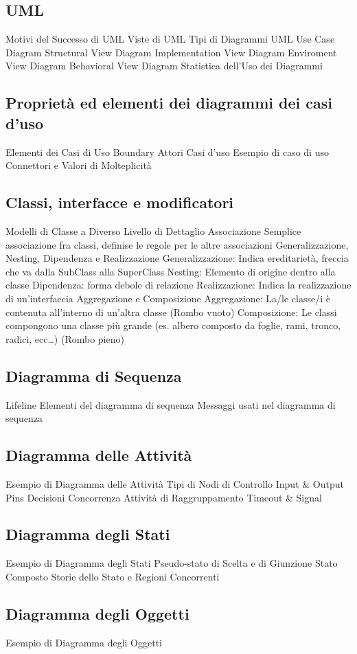 \documentclass{article}
\begin{document}
	\subsection{UML}
	Motivi del Successo di UML
	Viste di UML
	Tipi di Diagrammi UML
	Use Case Diagram
	Structural View Diagram
	Implementation View Diagram
	Enviroment View Diagram
	Behavioral View Diagram
	Statistica dell’Uso dei Diagrammi
	\subsection{Proprietà ed elementi dei diagrammi dei casi d’uso}
	Elementi dei Casi di Uso
	Boundary
	Attori
	Casi d’uso
	Esempio di caso di uso
	Connettori e Valori di Molteplicità
	\subsection{Classi, interfacce e modificatori}
	Modelli di Classe a Diverso Livello di Dettaglio
	Associazione
	Semplice associazione fra classi, definise le regole per le altre associazioni
	Generalizzazione, Nesting, Dipendenza e Realizzazione
	Generalizzazione: Indica ereditarietà, freccia che va dalla SubClass alla SuperClass
	Nesting: Elemento di origine dentro alla classe
	Dipendenza: forma debole di relazione
	Realizzazione: Indica la realizzazione di un’interfaccia
	Aggregazione e Composizione
	Aggregazione: La/le classe/i è contenuta all’interno di un’altra classe (Rombo vuoto)
	Composizione: Le classi compongono una classe più grande (es. albero composto da foglie, rami, tronco, radici, ecc…) (Rombo pieno)
	\subsection{Diagramma di Sequenza}
	Lifeline
	Elementi del diagramma di sequenza
	Messaggi usati nel diagramma di sequenza
	\subsection{Diagramma delle Attività}
	Esempio di Diagramma delle Attività
	Tipi di Nodi di Controllo
	Input \& Output Pins
	Decisioni
	Concorrenza
	Attività di Raggruppamento
	Timeout \& Signal
	\subsection{Diagramma degli Stati}
	Esempio di Diagramma degli Stati
	Pseudo-stato di Scelta e di Giunzione
	Stato Composto
	Storie dello Stato e Regioni Concorrenti
	\subsection{Diagramma degli Oggetti}
	Esempio di Diagramma degli Oggetti
\end{document}
